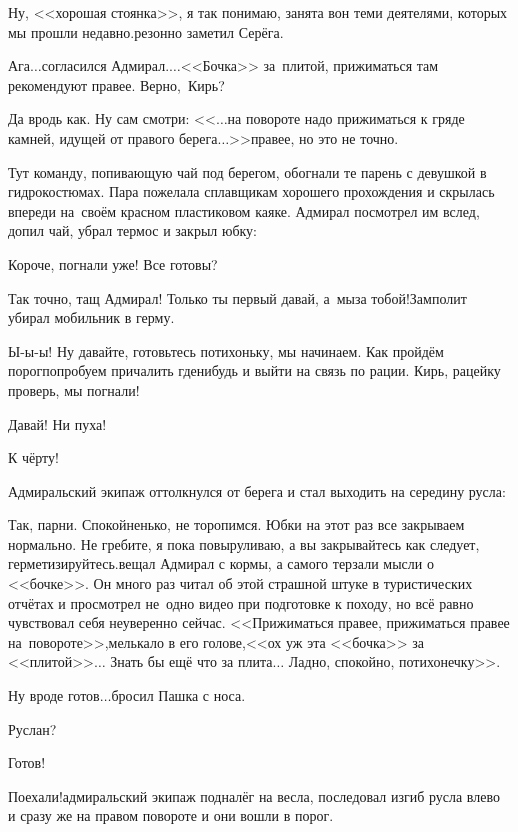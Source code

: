 \diagdash Ну, <<хорошая стоянка>>, я так понимаю, занята вон теми деятелями, которых мы прошли недавно.\mdash резонно заметил Серёга.

\diagdash Ага$\ldots$\mdash согласился Адмирал.\mdash$\ldots$<<Бочка>> за~плитой, прижиматься там рекомендуют правее. Верно,~Кирь?

\diagdash Да вродь как. Ну сам смотри: <<$\ldots$на повороте надо прижиматься к гряде камней, идущей от правого берега$\ldots$>>\mdash правее, но это не точно.

Тут команду, попивающую чай под берегом, обогнали те парень с девушкой в гидрокостюмах. Пара пожелала сплавщикам хорошего прохождения и скрылась впереди на~своём красном пластиковом каяке. Адмирал посмотрел им вслед, допил чай, убрал термос и закрыл юбку:

\diagdash Короче, погнали уже! Все готовы?

\diagdash Так точно, тащ Адмирал! Только ты первый давай, а~мы\mdash за тобой!\mdash Замполит убирал мобильник в герму.

\diagdash Ы-ы-ы! Ну давайте, готовьтесь потихоньку, мы начинаем. Как пройдём порог\mdash попробуем причалить где\sdash нибудь и выйти на связь по рации. Кирь, рацейку проверь, мы погнали!

\diagdash Давай! Ни пуха!

\diagdash К чёрту!

Адмиральский экипаж оттолкнулся от берега и стал выходить на середину русла:

\diagdash Так, парни. Спокойненько, не торопимся. Юбки на этот раз все закрываем нормально. Не гребите, я пока повыруливаю, а вы закрывайтесь как следует, герметизируйтесь.\mdash вещал Адмирал с кормы, а самого терзали мысли о <<бочке>>. Он много раз читал об этой страшной штуке в туристических отчётах и просмотрел не~одно видео при подготовке к походу, но всё равно чувствовал себя неуверенно сейчас. <<Прижиматься правее, прижиматься правее на~повороте>>,\mdash мелькало в его голове,\mdash<<ох уж эта <<бочка>> за <<плитой>>$\ldots$ Знать бы ещё что за плита$\ldots$ Ладно, спокойно, потихонечку>>.

\diagdash Ну вроде готов$\ldots$\mdash бросил Пашка с носа.

\diagdash Руслан?

\diagdash Готов!

\diagdash Поехали!\mdash адмиральский экипаж подналёг на весла, последовал изгиб русла влево и сразу же на правом повороте и они вошли в порог.

